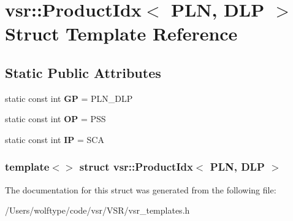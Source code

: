 \hypertarget{structvsr_1_1_product_idx_3_01_p_l_n_00_01_d_l_p_01_4}{\section{vsr\-:\-:Product\-Idx$<$ P\-L\-N, D\-L\-P $>$ Struct Template Reference}
\label{structvsr_1_1_product_idx_3_01_p_l_n_00_01_d_l_p_01_4}
}
\subsection*{Static Public Attributes}
\begin{DoxyCompactItemize}
\item 
\hypertarget{structvsr_1_1_product_idx_3_01_p_l_n_00_01_d_l_p_01_4_a09a06767b28cc5714ccfec34d44233d1}{static const int {\bfseries G\-P} = P\-L\-N\-\_\-\-D\-L\-P}\label{structvsr_1_1_product_idx_3_01_p_l_n_00_01_d_l_p_01_4_a09a06767b28cc5714ccfec34d44233d1}

\item 
\hypertarget{structvsr_1_1_product_idx_3_01_p_l_n_00_01_d_l_p_01_4_aee25c9607fc853432df9490ee7d98bae}{static const int {\bfseries O\-P} = P\-S\-S}\label{structvsr_1_1_product_idx_3_01_p_l_n_00_01_d_l_p_01_4_aee25c9607fc853432df9490ee7d98bae}

\item 
\hypertarget{structvsr_1_1_product_idx_3_01_p_l_n_00_01_d_l_p_01_4_a48e02efaec3b80660b1d14996e926d64}{static const int {\bfseries I\-P} = S\-C\-A}\label{structvsr_1_1_product_idx_3_01_p_l_n_00_01_d_l_p_01_4_a48e02efaec3b80660b1d14996e926d64}

\end{DoxyCompactItemize}
\subsubsection*{template$<$$>$ struct vsr\-::\-Product\-Idx$<$ P\-L\-N, D\-L\-P $>$}



The documentation for this struct was generated from the following file\-:\begin{DoxyCompactItemize}
\item 
/\-Users/wolftype/code/vsr/\-V\-S\-R/vsr\-\_\-templates.\-h\end{DoxyCompactItemize}
